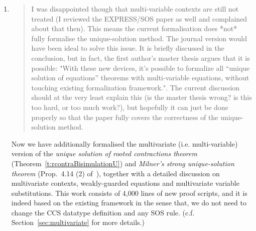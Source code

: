 \begin{enumerate}
  


\item \begin{quote}
    I was disappointed though that multi-variable contexts are still
    not treated (I reviewed the EXPRESS/SOS paper as well and
    complained about that then). This means the current formalisation
    does *not* fully formalise the unique-solution method. The journal
    version would have been ideal to solve this issue. It is briefly
    discussed in the conclusion, but in fact, the first author's
    master thesis argues that it is possible: "With these new devices,
    it’s possible to formalize all “unique solution of equations”
    theorems with multi-variable equations, without touching existing
    formalization framework.". The current discussion should at the
    very least explain this (is the master thesis wrong? is this too
    hard, or too much work?), but hopefully it can just be done
    properly so that the paper fully covers the correctness of the
    unique-solution method. 
  \end{quote}

  Now we have additionally formalised the multivariate (i.e. multi-variable)
  version of the \emph{unique solution of rooted contractions theorem}
  (Theorem~\ref{t:rcontraBisimulationU}) and \emph{Milner's strong
  unique-solution theorem} (Prop.~4.14 (2)
  of~\citep[p.~103]{Mil89}), together with a detailed discussion on
  multivariate contexts, weakly-guarded equations and multivariate
  variable substitutions. This work consists of 4,000 lines of new
  proof scripts, and it is indeed based on the existing framework in
  the sense that, we do not need to change the CCS datatype definition
  and any SOS rule. (c.f. Section~\ref{sec:multivariate} for more details.)


\end{enumerate}
